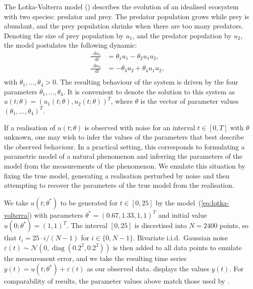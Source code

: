 \documentclass[11pt,a4paper]{report}
\newcommand*\diff{\mathop{}\!\mathrm{d}}
\DeclareMathOperator{\diag}{diag}
\begin{document}
The Lotka-Volterra model (\cite{lotkaElementsPhysicalBiology1925,volterraVariazioniFluttuazioniNumero1926}) describes the evolution of an idealised ecosystem with two species: predator and prey. The predator population grows while prey is abundant, and the prey population shrinks when there are too many predators. Denoting the size of prey population by $u_1$, and the predator population by $u_2$, the model postulates the following dynamic:
\begin{equation}
\begin{aligned}
\frac{\diff u_1}{\diff t} & = \theta_1 u_1 - \theta_2 u_1 u_2, \\
\frac{\diff u_2}{\diff t} & = -\theta_3 u_2 + \theta_4 u_1 u_2, \\
\end{aligned}
\label{eq:lotka-volterra}
\end{equation}
with $\theta_1, \dots, \theta_4 > 0$. The resulting behaviour of the system is driven by the four parameters $\theta_1, \dots, \theta_4$. It is convenient to denote the solution to this system as  $u(t;\theta) = (u_1(t; \theta), u_2(t; \theta))^T$, where $\theta$ is the vector of parameter values $(\theta_1, \dots, \theta_4)^T$.

If a realisation of $u(t; \theta)$ is observed with noise for an interval $t \in [0, T]$ with $\theta$ unknown, one may wish to infer the values of the parameters that best describe the observed behaviour. In a practical setting, this corresponds to formulating a parametric model of a natural phenomenon and inferring the parameters of the model from the measurements of the phenomenon. We emulate this situation by fixing the true model, generating a realisation perturbed by noise and then attempting to recover the parameters of the true model from the realisation.

We take $u(t;\theta^*)$ to be generated for $t \in [0, 25]$ by the model~(\ref{eq:lotka-volterra}) with parameters $\theta^* = (0.67, 1.33, 1, 1)^T$ and initial value $u(0; \theta^*) = (1, 1)^T$. The interval $[0, 25]$ is discretised into $N = 2400$ points, so that $t_i = 25 \cdot i / (N - 1)$ for $i \in \{0, N - 1\}$. Bivariate i.i.d.\ Gaussian noise $\varepsilon(t) \sim \mathcal{N}\left( 0, \diag(0.2^2, 0.2^2) \right)$ is then added to all data points to emulate the measurement error, and we take the resulting time series $y(t) = u(t;\theta^*) + \varepsilon(t)$ as our observed data.  displays the values $y(t)$. For comparability of results, the parameter values above match those used by \cite{riabizOptimalThinningMCMC2022}. 
\end{document}
